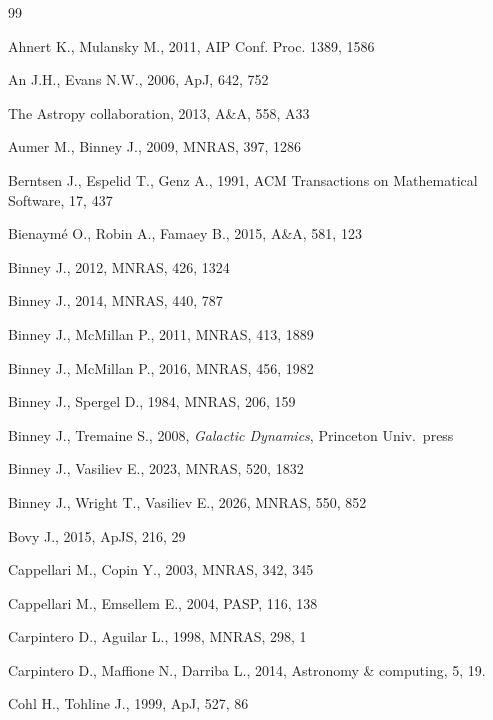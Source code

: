 \documentclass[12pt]{article}
\begin{document}
\newpage
{}

\begin{thebibliography}{99} \setlength{\parskip}{2pt} \setlength{\itemsep}{2pt}

Ahnert K., Mulansky M., 2011, AIP Conf. Proc. 1389, 1586

An J.H., Evans N.W., 2006, ApJ, 642, 752

The Astropy collaboration, 2013, A\&A, 558, A33

Aumer M., Binney J., 2009, MNRAS, 397, 1286

Berntsen J., Espelid T., Genz A., 1991, ACM Transactions on Mathematical Software, 17, 437

Bienaym\'e O., Robin A., Famaey B., 2015, A\&A, 581, 123

Binney J., 2012, MNRAS, 426, 1324

Binney J., 2014, MNRAS, 440, 787

Binney J., McMillan P., 2011, MNRAS, 413, 1889

Binney J., McMillan P., 2016, MNRAS, 456, 1982

Binney J., Spergel D., 1984, MNRAS, 206, 159

Binney J., Tremaine S., 2008, \textsl{Galactic Dynamics}, Princeton Univ.\ press

Binney J., Vasiliev E., 2023, MNRAS, 520, 1832

Binney J., Wright T., Vasiliev E., 2026, MNRAS, 550, 852

Bovy J., 2015, ApJS, 216, 29

Cappellari M., Copin Y., 2003, MNRAS, 342, 345

Cappellari M., Emsellem E., 2004, PASP, 116, 138

Carpintero D., Aguilar L., 1998, MNRAS, 298, 1

Carpintero D., Maffione N., Darriba L., 2014, Astronomy \& computing, 5, 19.

Cohl H., Tohline J., 1999, ApJ, 527, 86


\end{thebibliography}
\end{document}
